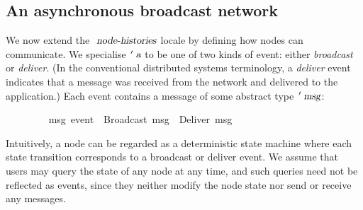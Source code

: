\subsection{An asynchronous broadcast network}\label{sect.network.broadcast}

We now extend the $\isa{node-histories}$ locale by defining how nodes can communicate.
We specialise $\isacharprime\isa{a}$ to be one of two kinds of event: either \emph{broadcast} or \emph{deliver}.
(In the conventional distributed systems terminology, a \emph{deliver} event indicates that a message was received from the network and delivered to the application.)
Each event contains a message of some abstract type $\isacharprime\isa{msg}$:
\vspace{0.25em}
\begin{isabellebody}
\ \ \ \ \ \ \ \  {\isacharprime}msg\ event\ {\isacharequal}\ Broadcast\ {\isacharprime}msg\ {\isacharbar}\ Deliver\ {\isacharprime}msg
\end{isabellebody}
\vspace{0.25em}
Intuitively, a node can be regarded as a deterministic state machine where each state transition corresponds to a broadcast or deliver event.
We assume that users may query the state of any node at any time, and such queries need not be reflected as events, since they neither modify the node state nor send or receive any messages.

